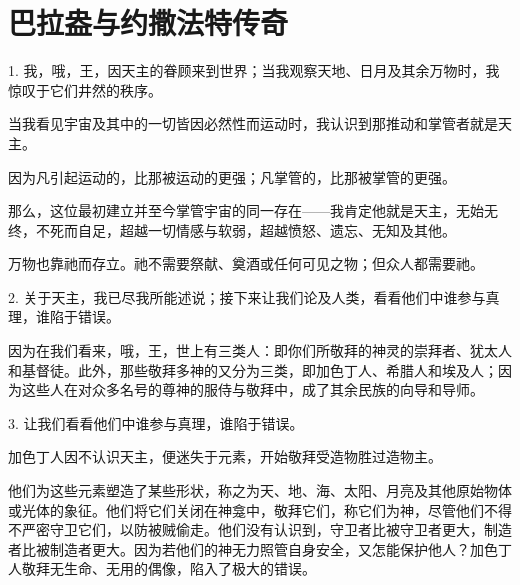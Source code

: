 
\chapter{巴拉盎与约撒法特传奇}


\par

1. 我，哦，王，因天主的眷顾来到世界；当我观察天地、日月及其余万物时，我惊叹于它们井然的秩序。\par

当我看见宇宙及其中的一切皆因必然性而运动时，我认识到那推动和掌管者就是天主。\par

因为凡引起运动的，比那被运动的更强；凡掌管的，比那被掌管的更强。\par

那么，这位最初建立并至今掌管宇宙的同一存在——我肯定他就是天主，无始无终，不死而自足，超越一切情感与软弱，超越愤怒、遗忘、无知及其他。\par

万物也靠祂而存立。祂不需要祭献、奠酒或任何可见之物；但众人都需要祂。\par

2. 关于天主，我已尽我所能述说；接下来让我们论及人类，看看他们中谁参与真理，谁陷于错误。\par

因为在我们看来，哦，王，世上有三类人：即你们所敬拜的神灵的崇拜者、犹太人和基督徒。此外，那些敬拜多神的又分为三类，即加色丁人、希腊人和埃及人；因为这些人在对众多名号的尊神的服侍与敬拜中，成了其余民族的向导和导师。\par

3. 让我们看看他们中谁参与真理，谁陷于错误。\par

加色丁人因不认识天主，便迷失于元素，开始敬拜受造物胜过造物主。\par

他们为这些元素塑造了某些形状，称之为天、地、海、太阳、月亮及其他原始物体或光体的象征。他们将它们关闭在神龛中，敬拜它们，称它们为神，尽管他们不得不严密守卫它们，以防被贼偷走。他们没有认识到，守卫者比被守卫者更大，制造者比被制造者更大。因为若他们的神无力照管自身安全，又怎能保护他人？加色丁人敬拜无生命、无用的偶像，陷入了极大的错误。\par

